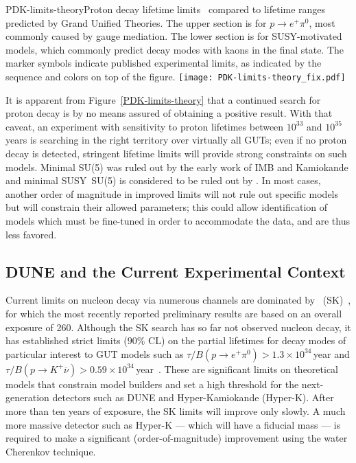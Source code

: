 \begin{cdrfigure}{PDK-limits-theory}{Proton decay lifetime
limits~\cite{Beringer:1900zz,Nishino:2012ipa} compared to lifetime ranges
  predicted by Grand Unified Theories. The upper section is for
  $p \rightarrow e^+ \pi^0$, most commonly caused by gauge mediation.
  The lower section is for SUSY-motivated models, which commonly
  predict decay modes with kaons in the final state. The
  marker symbols indicate published experimental limits, as indicated
  by the sequence and colors on top of the figure.}
\texttt{[image: PDK-limits-theory\_fix.pdf]}
\end{cdrfigure}


It is apparent from Figure~\ref{PDK-limits-theory} that a continued
search for proton decay is by no means assured of obtaining a positive
result.  With that caveat, an experiment with sensitivity to proton lifetimes
between $10^{33}$ and $10^{35}$ years is searching in the right territory over
virtually all GUTs; even if no proton decay is detected,
stringent lifetime limits will provide strong constraints on such
models.  Minimal SU(5) was ruled out by the early work of IMB and
Kamiokande and minimal SUSY~SU(5) is considered to be ruled out by \superk.
In most cases, another order of magnitude in improved limits will not rule out
specific models but will constrain their allowed parameters;
this could allow identification of models which must be fine-tuned
in order to accommodate the data, and are thus less favored.

\subsection{DUNE and the Current Experimental Context}

Current limits on nucleon decay via numerous channels are dominated by
\superk\ (SK)~\cite{Raaf:2012pva}, for which the most recently
reported preliminary results are based on an overall exposure of
\SI{260}{\ktyr}.
%
Although the SK search has so far not observed nucleon decay, it
has established strict limits ($90\%$ CL) on the partial lifetimes for
decay modes of particular interest to GUT models such as $\tau/B(p\to
e^+\pi^0) > 1.3\times 10^{\mathrm{34}}\,$year and $\tau/B(p\to
K^+\overline{\nu}) > 0.59\times
10^{\mathrm{34}}\,$year~\cite{kearns_isoups}.  These are significant
limits on theoretical models that constrain model builders and set a
high threshold for the next-generation detectors such as DUNE and
Hyper-Kamiokande (Hyper-K). After more than ten years of exposure, the SK limits
will improve only slowly. A much more massive detector such as
Hyper-K --- which will have a  fiducial mass 
--- is required to make a significant (order-of-magnitude) improvement 
using the water Cherenkov technique.

